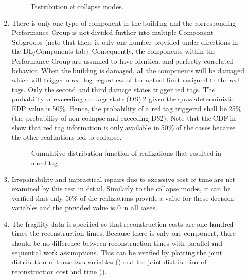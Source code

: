 \begin{enumerate}
\begin{figure}[!htbp]
  \caption{Distribution of collapse modes.}
  \label{fig:ver_1_6}
\end{figure}

    \item There is only one type of component in the building and the corresponding Performance Group is not divided further into multiple Component Subgroups (note that there is only one number provided under directions in the DL/Components tab). Consequently, the components within the Performance Group are assumed to have identical and perfectly correlated behavior. When the building is damaged, all the components will be damaged which will trigger a red tag regardless of the actual limit assigned to the red tags. Only the second and third damage states trigger red tags. The probability of exceeding damage state (DS) 2 given the quasi-deterministic EDP value is 50\%. Hence, the probability of a red tag triggered shall be 25\% (the probability of non-collapse and exceeding DS2). Note that the CDF in  show that red tag information is only available in 50\% of the cases because the other realizations led to collapse.
    
\begin{figure}[!htbp]
  \caption{Cumulative distribution function of realizations that resulted in a red tag.}
  \label{fig:ver_1_7}
\end{figure}

    \item Irrepairability and impractical repairs due to excessive cost or time are not examined by this test in detail. Similarly to the collapse modes, it can be verified that only 50\% of the realizations provide a value for these decision variables and the provided value is 0 in all cases.
    \item The fragility data is specified so that reconstruction costs are one hundred times the reconstruction times. Because there is only one component, there should be no difference between reconstruction times with parallel and sequential work assumptions. This can be verified by plotting the joint distribution of those two variables () and the joint distribution of reconstruction cost and time ().
    

\end{enumerate}
